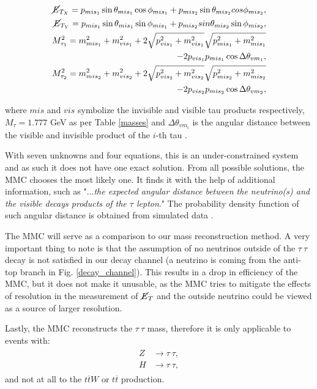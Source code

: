 \documentclass{ctuthesis}
\begin{document}
\begin{align}
\begin{split}
\cancel{E}_{T_X} = p_{mis_1} \sin\theta_{mis_1} \cos \phi_{mis_1} + p_{mis_2} \sin \theta_{mis_2} cos\phi_{mis_2}, \\
\cancel{E}_{T_Y} = p_{mis_1} \sin\theta_{mis_1} \sin \phi_{mis_1} + p_{mis_2} sin \theta_{mis_2} \sin\phi_{mis_2}, \\
M^2_{\tau_1} = m^2_{mis_1} + m^2_{vis_1} + 2\sqrt{p^2_{vis_1}+m^2_{vis_1}}\sqrt{p^2_{mis_1}+m^2_{mis_1}} \\- 2 p_{vis_1}p_{mis_1}\cos \Delta\theta_{vm_1}, \\
M^2_{\tau_2} = m^2_{mis_2} + m^2_{vis_2} + 2\sqrt{p^2_{vis_2}+m^2_{vis_2}}\sqrt{p^2_{mis_2}+m^2_{mis_2}} \\- 2 p_{vis_2}p_{mis_2}\cos \Delta\theta_{vm_2},
\end{split}
\label{mmc_eqs}
\end{align}

where $mis$ and $vis$ symbolize the invisible and visible tau products respectively, $M_\tau = 1.777$ GeV as per Table \ref{masses} and $\Delta\theta_{vm_i}$ is the angular distance between the visible and invisible product of the $i$-th tau \cite[p.6]{mmc_paper}.

With seven unknowns and four equations, this is an under-constrained system and as such it does not have one exact solution. From all possible solutions, the MMC chooses the most likely one. It finds it with the help of additional information, such as "...\emph{the expected angular distance between the neutrino(s) and the visible decays products of the $\tau$ lepton}." \cite[p.6]{mmc_paper} The probability density function of such angular distance is obtained from simulated data \cite[p.7]{mmc_paper}.

The MMC will serve as a comparison to our mass reconstruction method. A very important thing to note is that the assumption of no neutrinos outside of the $\tau\: \tau$ decay is not satisfied in our decay channel (a neutrino is coming from the anti-top branch in Fig. \ref{decay_channel}). This results in a drop in efficiency of the MMC, but it does not make it unusable, as the MMC tries to mitigate the effects of resolution in the measurement of $\cancel{E}_T$ \cite[p.10]{mmc_paper} and the outside neutrino could be viewed as a source of larger resolution.

Lastly, the MMC reconstructs the $\tau\: \tau$ mass, therefore it is only applicable to events with:
\begin{align}
\begin{split}
Z &\rightarrow \tau\: \tau, \\
H &\rightarrow \tau\: \tau,
\end{split}
\end{align}
and not at all to the $t\overline{t}W$ or $t\overline{t}$ production.
\end{document}
